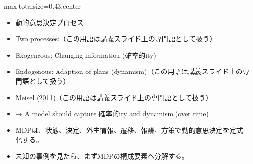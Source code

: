 \clearpage
{}
\begin{minipage}[t]{0.405\textwidth}
\begin{adjustbox}{max totalsize={\textwidth}{0.43\textheight},center}
\begin{minipage}{\textwidth}\scriptsize
{}\begin{itemize}
\item 動的意思決定プロセス
\item Two processes:（この用語は講義スライド上の専門語として扱う）
\item Exogeneous: Changing information (確率的ity)
\item Endogenous: Adaption of plans (dynamism)（この用語は講義スライド上の専門語として扱う）
\item Meisel (2011)（この用語は講義スライド上の専門語として扱う）
\item → A model should capture 確率的ity and dynamism (over time)
\end{itemize}\begin{itemize}
\item MDPは、状態、決定、外生情報、遷移、報酬、方策で動的意思決定を定式化する。
\item 未知の事例を見たら、まずMDPの構成要素へ分解する。
\end{itemize}
\end{minipage}
\end{adjustbox}
\end{minipage}\hfill

